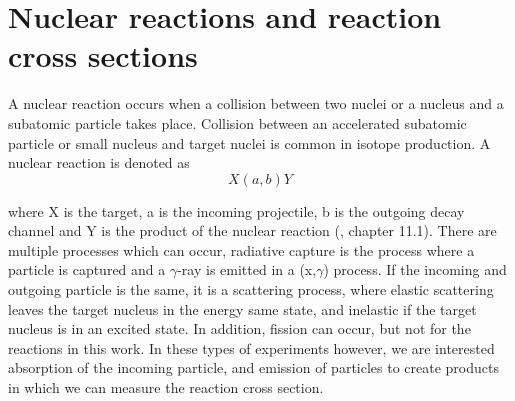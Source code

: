 

\section{Nuclear reactions and reaction cross sections}

A nuclear reaction occurs when a collision between two nuclei or a nucleus and a subatomic particle takes place. Collision between an accelerated subatomic particle or small nucleus and target nuclei is common in isotope production. A nuclear reaction is denoted as
\begin{equation}
    X(a,b)Y
\end{equation}

\noindent where X is the target, a is the incoming projectile, b is the outgoing decay channel and Y is the product of the nuclear reaction (\cite{KraneKennethS.Halliday1987}, chapter 11.1). There are multiple processes which can occur, radiative capture is the process where a particle is captured and a $\gamma$-ray is emitted in a (x,$\gamma$) process. If the incoming and outgoing particle is the same, it is a scattering process, where elastic scattering leaves the target nucleus in the energy same state, and inelastic if the target nucleus is in an excited state. In addition, fission can occur, but not for the reactions in this work. In these types of experiments however, we are interested absorption of the incoming particle, and emission of particles to create products in which we can measure the reaction cross section.  \\

